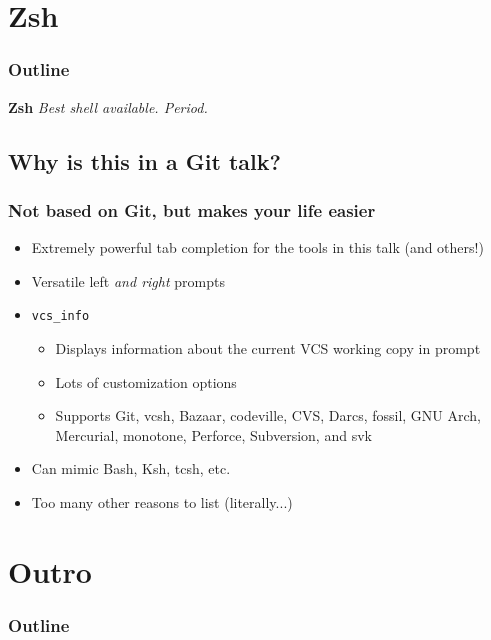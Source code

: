 \documentclass[t]{beamer}
\begin{document}
\section{Zsh}

\begin{frame}
	\frametitle{Outline}
	\tableofcontents[currentsection]
\end{frame}

\begin{frame}
		\begin{center}
			\vfill
			\vfill
			\textbf{Zsh}
			\vfill
			\textit{Best shell available. Period.}
			\vfill
			\vfill
		\end{center}
\end{frame}

\subsection{Why is this in a Git talk?}

\begin{frame}
	\frametitle{Not based on Git, but makes your life easier}
	\begin{itemize}
		\item Extremely powerful tab completion for the tools in this talk (and others!)
		\item Versatile left \emph{and right} prompts
		\item \texttt{vcs\_info}
		\begin{itemize}
			\item Displays information about the current VCS working copy in prompt
			\item Lots of customization options
			\item Supports Git, vcsh, Bazaar, codeville, CVS, Darcs, fossil, GNU Arch, Mercurial, monotone, Perforce, Subversion, and svk
		\end{itemize}
		\item Can mimic Bash, Ksh, tcsh, etc.
		\item Too many other reasons to list (literally...)
	\end{itemize}
\end{frame}


\section{Outro}

\begin{frame}
	\frametitle{Outline}
	\tableofcontents[currentsection]
\end{frame}
\end{document}
